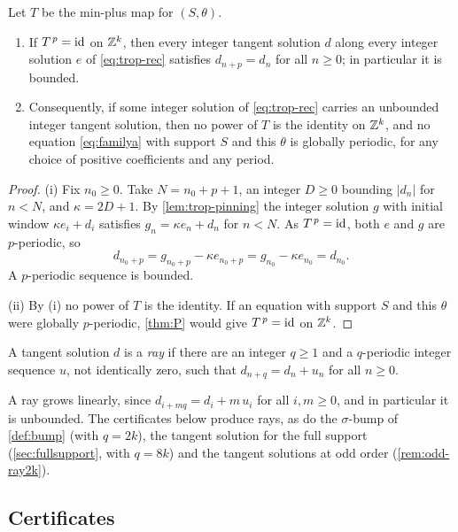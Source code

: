 \begin{theorem}
\label{thm:tangent}
Let $T$ be the min-plus map for $(S,\theta)$.
\begin{enumerate}
\item[(i)] If $T^{\,p}=\mathrm{id}$ on $\mathbb{Z}^k$, then every integer tangent solution $d$
along every integer solution $e$ of \eqref{eq:trop-rec} satisfies $d_{n+p}=d_n$
for all $n\ge0$; in particular it is bounded.
\item[(ii)] Consequently, if some integer solution of \eqref{eq:trop-rec} carries
an unbounded integer tangent solution, then no power of $T$ is the identity on
$\mathbb{Z}^k$, and no equation \eqref{eq:familya} with support $S$ and this $\theta$ is
globally periodic, for any choice of positive coefficients and any period.
\end{enumerate}
\end{theorem}

\begin{proof}
(i) Fix $n_0\ge0$. Take $N=n_0+p+1$, an integer $D\ge0$ bounding $|d_n|$ for
$n<N$, and $\kappa=2D+1$. By \autoref{lem:trop-pinning} the integer solution $g$
with initial window $\kappa e_i+d_i$ satisfies $g_n=\kappa e_n+d_n$ for $n<N$. As
$T^{\,p}=\mathrm{id}$, both $e$ and $g$ are $p$-periodic, so
\[
d_{n_0+p}=g_{n_0+p}-\kappa e_{n_0+p}=g_{n_0}-\kappa e_{n_0}=d_{n_0}.
\]
A $p$-periodic sequence is bounded.

(ii) By (i) no power of $T$ is the identity. If an equation with support $S$
and this $\theta$ were globally $p$-periodic, \autoref{thm:P} would give
$T^{\,p}=\mathrm{id}$ on $\mathbb{Z}^k$.
\end{proof}

\begin{definition}
\label{def:trop-ray}
A tangent solution $d$ is a \emph{ray} if there are an integer $q\ge1$ and a
$q$-periodic integer sequence $u$, not identically zero, such that
$d_{n+q}=d_n+u_n$ for all $n\ge0$.
\end{definition}

A ray grows linearly, since $d_{i+mq}=d_i+m\,u_i$ for all $i,m\ge0$, and in
particular it is unbounded. The certificates below produce rays, as do the
$\sigma$-bump of \autoref{def:bump} (with $q=2k$), the tangent solution for
the full support (\autoref{sec:fullsupport}, with $q=8k$) and the tangent
solutions at odd order (\autoref{rem:odd-ray2k}).

\subsection{Certificates}

